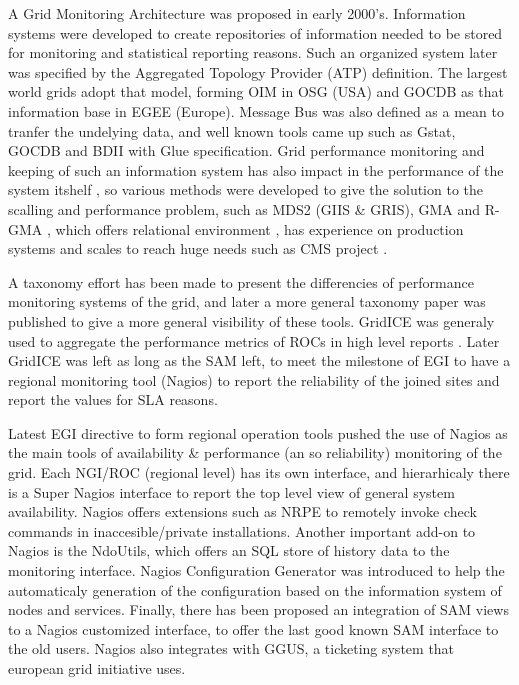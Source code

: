 \documentclass[a4paper,12pt,oneside]{book}
\begin{document}
A Grid Monitoring Architecture \cite{tierney2002grid} was proposed in early
2000's. Information systems were developed to create repositories of information
needed to be stored for monitoring and statistical reporting reasons. Such an
organized system later was specified by the Aggregated Topology Provider (ATP)
definition. The largest world grids adopt that model, forming OIM in OSG (USA)
and GOCDB as that information base in EGEE (Europe). Message Bus was also
defined as a mean to tranfer the undelying data, and well known tools came up
such as Gstat, GOCDB and BDII with Glue specification. Grid performance
monitoring and keeping of such an information system has also impact in the
performance of the system itshelf \cite{zhang2003performance}, so various
methods were developed to give the solution to the scalling and performance
problem, such as MDS2 (GIIS \& GRIS), GMA and R-GMA
\cite{wilson2004information}, which offers relational environment
\cite{fisher2001relational}, has experience on production systems 
\cite{byrom-production} and scales to reach huge needs such as CMS project
\cite{Bonacorsi2004,Byrom}.

A taxonomy effort has been made \cite{gerndt2004performance} to present the
differencies of performance monitoring systems of the grid, and later a more
general \cite{zanikolas2007importance} taxonomy paper was published to give a
more general visibility of these tools. GridICE was generaly used to aggregate
the performance metrics of ROCs in high level reports
\cite{andreozzi2005gridice}. Later GridICE was left as long as the SAM left, to
meet the milestone of EGI to have a regional monitoring tool (Nagios) to report
the reliability of the joined sites and report the values for SLA reasons.

Latest EGI directive to form regional operation tools pushed the use of Nagios
\cite{imamagic2007grid} as the main tools of availability \& performance (an so
reliability) monitoring of the grid. Each NGI/ROC (regional level) has its own
interface, and hierarhicaly there is a Super Nagios interface to report the top
level view of general system availability. Nagios offers extensions such as NRPE
to remotely invoke check commands in inaccesible/private installations.
Another important add-on to Nagios is the NdoUtils, which offers an SQL store
of history data to the monitoring interface. Nagios Configuration Generator was
introduced to help the automaticaly generation of the configuration based on
the information system of nodes and services. Finally, there has been proposed
an integration of SAM views to a Nagios customized interface, to offer the last
good known SAM interface to the old users. Nagios also integrates with GGUS, a
ticketing system that european grid initiative uses.
\end{document}
